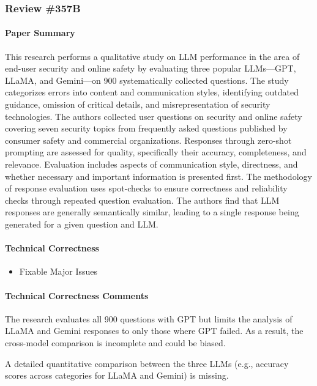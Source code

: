 \documentclass[letterpaper,twocolumn,10pt]{article}
\begin{document}
\hrulefill

\subsubsection*{Review \#357B}
\hrulefill

\paragraph{Paper Summary}
This research performs a qualitative study on LLM performance in the area of end-user security and online safety by evaluating three popular LLMs—GPT, LLaMA, and Gemini—on 900 systematically collected questions. The study categorizes errors into content and communication styles, identifying outdated guidance, omission of critical details, and misrepresentation of security technologies. The authors collected user questions on security and online safety covering seven security topics from frequently asked questions published by consumer safety and commercial organizations. Responses through zero-shot prompting are assessed for quality, specifically their accuracy, completeness, and relevance. Evaluation includes aspects of communication style, directness, and whether necessary and important information is presented first. The methodology of response evaluation uses spot-checks to ensure correctness and reliability checks through repeated question evaluation. The authors find that LLM responses are generally semantically similar, leading to a single response being generated for a given question and LLM.

\paragraph{Technical Correctness}
\begin{itemize}
    \item Fixable Major Issues
\end{itemize}

\paragraph{Technical Correctness Comments}
The research evaluates all 900 questions with GPT but limits the analysis of LLaMA and Gemini responses to only those where GPT failed. As a result, the cross-model comparison is incomplete and could be biased.

A detailed quantitative comparison between the three LLMs (e.g., accuracy scores across categories for LLaMA and Gemini) is missing.
\end{document}
